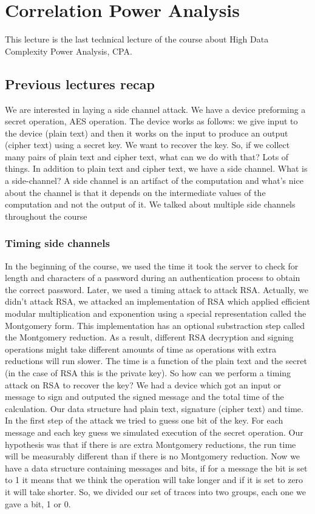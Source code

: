 \chapter{Correlation Power Analysis} \label{c8_fifthcapter}

This lecture is the last technical lecture of the course about High Data
Complexity Power Analysis, CPA.

\section{Previous lectures recap}\label{c8_prev_lectures_recap:sec}

We are interested in laying a side channel attack. We have a device preforming a
secret operation, AES operation. The device works as follows: we give input to
the device (plain text) and then it works on the input to produce an output
(cipher text) using a secret key. We want to recover the key. So, if we collect
many pairs of plain text and cipher text, what can we do with that? Lots of
things. In addition to plain text and cipher text, we have a side channel. What
is a side-channel? A side channel is an artifact of the computation and what's
nice about the channel is that it depends on the intermediate values of the
computation and not the output of it. We talked about multiple side channels
throughout the course

\subsection{Timing side channels}\label{c8_prev_lectures_recap_timing_sc:subsec}

In the beginning of the course, we used the time it took the server to check for length and characters of a password during an authentication process to obtain the correct password. Later, we used a timing attack to attack RSA.
Actually, we didn't attack RSA, we attacked an implementation of RSA which applied
efficient modular multiplication and exponention using a special representation called the Montgomery form. This implementation has an optional substraction step called the Montgomery reduction. As a result, different RSA decryption and signing operations might take different amounts of time as operations with extra reductions will run slower.  
The time is a function of the plain text and the secret (in the case of RSA this is
the private key). So how can we perform a timing attack on RSA to recover the key? We had a device
which got an input or message to sign and outputed the signed message and the total time of the calculation. Our data structure had
plain text, signature (cipher text) and time. In the first step of the attack we tried to
guess one bit of the key. For each message and each key guess we simulated execution of the
secret operation. Our hypothesis was that if there is are extra Montgomery reductions, the
run time will be measurably different than if there is no Montgomery reduction.
Now we have a data structure containing messages and bits, if for a message the bit is set to 1 it means that we think the operation will take longer and if it is set to zero it will take shorter. So, we divided our set of traces into two groups, each one we gave a bit, 1 or 0. 

